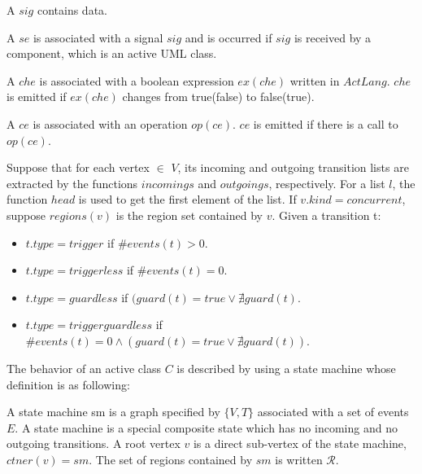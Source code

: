 \begin{definition} A  $sig$ contains data. 
\end{definition}

\begin{definition} A  $se$ is associated with a signal $sig$ and is occurred if $sig$ is received by a component, which is an active UML class. 
\end{definition}	

\begin{definition}
	A  $che$ is associated with a boolean expression $ex(che)$ written in $ActLang$. $che$ is emitted if $ex(che)$ changes from true(false) to false(true).
\end{definition}

\begin{definition}
	A  $ce$ is associated with an operation $op(ce)$. $ce$ is emitted if there is a call to $op(ce)$.
\end{definition}

Suppose that for each vertex  $\in$ $V$, its incoming and outgoing transition lists are extracted by the functions $incomings$ and $outgoings$, respectively. For a list $l$, the function $head$ is used to get the first element of the list. If $v.kind = concurrent$, suppose $regions(v)$ is the region set contained by $v$. Given a transition t:
\begin{itemize}
	\item $t.type = trigger$ if $\#events(t) > 0$.
	\item $t.type = triggerless$ if $\#events(t) = 0$.
	\item $t.type = guardless$ if $(guard(t) = true \vee \nexists guard(t)$.
	\item $t.type = triggerguardless$ if $\#events(t) = 0 \wedge (guard(t) = true \vee \nexists guard(t))$.
\end{itemize}

The behavior of an active class $C$ is described by using a state machine whose definition is as following:	

\begin{definition} A state machine sm is a graph specified by $\{V, T\}$ associated with a set of events $E$. A state machine is a special composite state which has no incoming and no outgoing transitions. A root vertex $v$ is a direct sub-vertex of the state machine, $ctner(v) = sm$. The set of regions contained by $sm$ is written $\mathcal{R}$.
\end{definition}	


